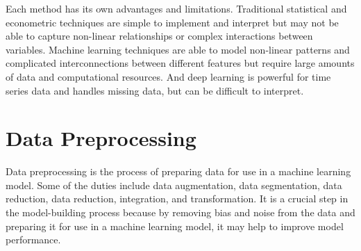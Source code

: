 \documentclass[a4paper]{article}
\begin{document}
Each method has its own advantages and limitations. Traditional statistical and econometric techniques are simple to implement and interpret but may not be able to capture non-linear relationships or complex interactions between variables. Machine learning techniques are able to model non-linear patterns and complicated interconnections between different features but require large amounts of data and computational resources. And deep learning is powerful for time series data and handles missing data, but can be difficult to interpret.

\section{Data Preprocessing}
Data preprocessing is the process of preparing data for use in a machine learning model. Some of the duties include data augmentation, data segmentation, data reduction, data reduction, integration, and transformation. It is a crucial step in the model-building process because by removing bias and noise from the data and preparing it for use in a machine learning model, it may help to improve model performance.
\end{document}
